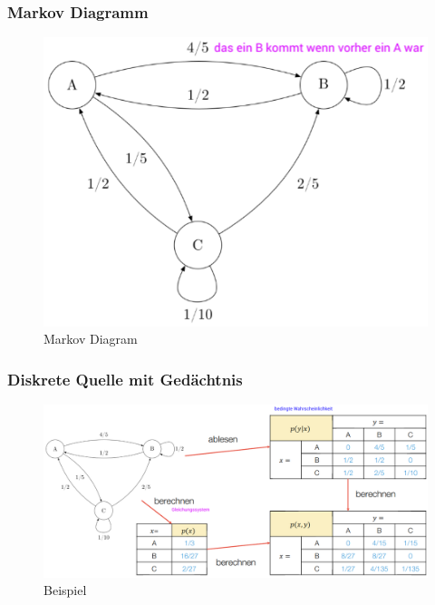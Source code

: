 \subsubsection{Markov Diagramm}
\begin{figure}[h!]
	\centering
	\begin{minipage}[t]{0.7\textwidth}
		\centering
		\includegraphics[width=0.9\linewidth]{images/markov}
		\caption{Markov Diagram}
		\label{fig:markov}
	\end{minipage}
\end{figure}


\subsubsection{Diskrete Quelle mit Gedächtnis}
\begin{figure}[h!]
	\centering
	\begin{minipage}[t]{0.9\textwidth}
		\centering
		\includegraphics[width=0.9\linewidth]{images/diskretequellemitgedaechtnis}
		\caption{Beispiel}
		\label{fig:diskretequelle}
	\end{minipage}
\end{figure}
\clearpage


